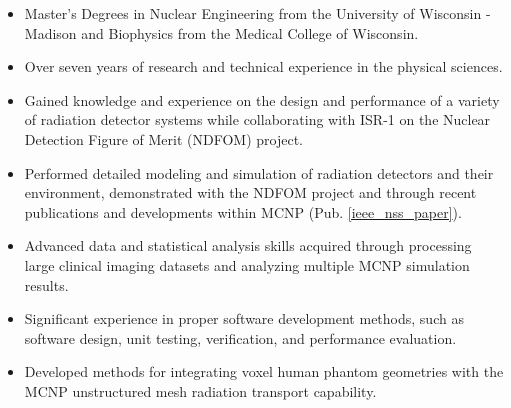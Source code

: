 \begin{center}
\begin{minipage}{\textwidth}

  \begin{itemize}[leftmargin=.15in,rightmargin=.25in,itemsep=0.8mm]

	\item Master's Degrees in Nuclear Engineering from the University of Wisconsin - Madison and Biophysics from the Medical College of Wisconsin.
	\item Over seven years of research and technical experience in the physical sciences.
		
	\item Gained knowledge and experience on the design and performance of a variety of radiation detector systems while collaborating with ISR-1 on the Nuclear Detection Figure of Merit (NDFOM) project.
	
	\item Performed detailed modeling and simulation of radiation detectors and their environment, demonstrated with the NDFOM project and through recent publications and developments within \textsc{MCNP} (Pub. \ref{ieee_nss_paper}).
	\item Advanced data and statistical analysis skills acquired through processing large clinical imaging datasets and analyzing multiple \textsc{MCNP} simulation results. 
		
	\item Significant experience in proper software development methods, such as software design, unit testing, verification, and performance evaluation.
	\item Developed methods for integrating voxel human phantom geometries with the \textsc{MCNP} unstructured mesh radiation transport capability.
		

\end{itemize}
\end{minipage}
\end{center}
